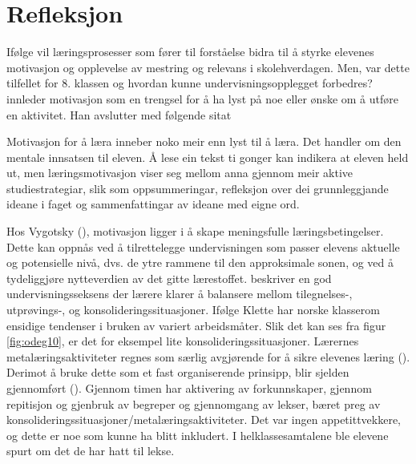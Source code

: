 \documentclass[main.tex]{subfiles}
\begin{document}
\section*{Refleksjon}
\label{sec:3}

Ifølge  vil læringsprosesser som fører til forståelse bidra til å styrke elevenes 
motivasjon og opplevelse av mestring og relevans i skolehverdagen. Men, var dette tilfellet for 8. 
klassen og hvordan kunne undervisningsopplegget forbedres?
\newline
\newline
{} innleder motivasjon som en trengsel for å ha lyst på noe eller ønske om å 
utføre en aktivitet. Han avslutter med følgende sitat
\begin{displayquote}
Motivasjon for å læra inneber noko meir enn lyst til å læra. Det handler om den 
mentale innsatsen til eleven. Å lese ein tekst ti gonger kan indikera at eleven held ut, men  
læringsmotivasjon viser seg mellom anna gjennom meir aktive studiestrategiar, slik som 
oppsummeringar, refleksjon over dei grunnleggjande ideane i faget og sammenfattingar av ideane med 
eigne ord.
\end{displayquote}
Hos Vygotsky (), motivasjon ligger i å skape meningsfulle læringsbetingelser. 
Dette kan oppnås ved å tilrettelegge undervisningen som passer elevens aktuelle og potensielle nivå, 
dvs. de ytre rammene til den approksimale sonen, og ved å tydeliggjøre nytteverdien av det gitte 
lærestoffet.
\newline
\newline
{} beskriver en god undervisningsseksens der lærere klarer å balansere mellom 
tilegnelses-, utprøvings-, og konsolideringssituasjoner. Ifølge Klette har norske klasserom ensidige 
tendenser i bruken av variert arbeidsmåter. Slik det kan ses fra figur \ref{fig:odeg10}, er det for 
eksempel lite konsolideringssituasjoner. Lærernes metalæringsaktiviteter regnes som særlig 
avgjørende for å sikre elevenes læring (). Derimot å bruke dette som et fast
organiserende prinsipp, blir sjelden gjennomført (). Gjennom timen har 
aktivering av forkunnskaper, gjennom repitisjon og gjenbruk av begreper og gjennomgang av 
lekser, bæret preg av konsolideringssituasjoner/metalæringsaktiviteter. Det var ingen 
appetittvekkere, og dette er noe som kunne ha blitt inkludert.
\newline
\newline
I helklassesamtalene ble elevene spurt om det de har hatt til lekse.
\end{document}
